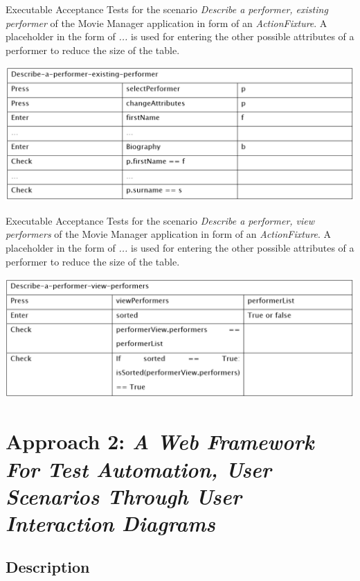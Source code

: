 \begin{table}[H]
	\caption{Executable Acceptance Tests for the scenario \textit{Describe a performer, existing performer} of the Movie Manager application in form of an \textit{ActionFixture}.
	A placeholder in the form of \textit{...} is used for entering the other possible attributes of a performer to reduce the size of the table.}
	\centering
	\includegraphics[width=.9\textwidth]{../images/ElAttarEATs2.png}

	
	\label{fig:eats2-mm}
\end{table}

\begin{table}[H]
	\caption{Executable Acceptance Tests for the scenario \textit{Describe a performer, view performers} of the Movie Manager application in form of an \textit{ActionFixture}.
	A placeholder in the form of \textit{...} is used for entering the other possible attributes of a performer to reduce the size of the table.}
	\centering
	\includegraphics[width=.9\textwidth]{../images/ElAttarEATs3.png}

	
	\label{fig:eats3-mm}
\end{table}


\section{Approach 2: \textit{A Web Framework For Test Automation, User Scenarios
Through User Interaction Diagrams}}
\label{sec:longo}

\subsection{Description}

